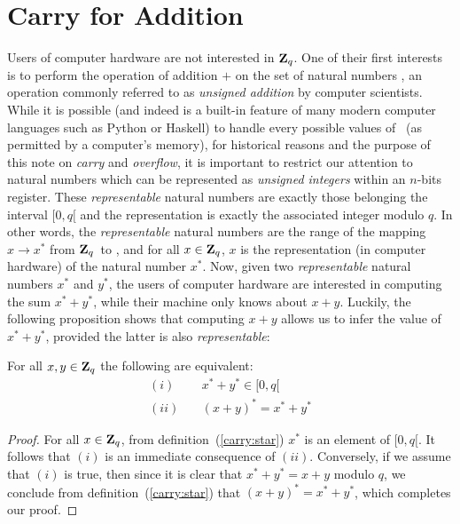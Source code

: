 \documentclass{article}
\newcommand{\zq}{\mbox{${\bf Z}_{q}$}}
\begin{document}
\section{Carry for Addition}
Users of computer hardware are not interested in \zq. One of their first interests
is to perform the operation of addition $+$ on the set of natural numbers \N, 
an operation commonly referred to as {\em unsigned addition} by computer 
scientists. While it is possible (and indeed is a built-in feature of many modern 
computer languages such as Python or Haskell) to handle every possible values 
of \N\ (as permitted by a computer's memory), for historical reasons and the 
purpose of this note on {\em carry} and {\em overflow}, it is important to 
restrict our attention to natural numbers which can be represented as 
{\em unsigned integers} within an $n$-bits register. These {\em representable}
natural numbers are exactly those belonging the interval $[0,q[$ and the
representation is exactly the associated integer modulo $q$. In other words,
the {\em representable} natural numbers are the range of the mapping 
$x\rightarrow x^{*}$ from \zq\ to \N, and for all $x\in\zq$, $x$ is the
representation (in computer hardware) of the natural number $x^{*}$. Now,
given two {\em representable} natural numbers $x^{*}$ and $y^{*}$, the users of 
computer hardware are interested in computing the sum $x^{*} + y^{*}$, while 
their machine only knows about $x+y$. Luckily, the following proposition shows that
computing $x+y$ allows us to infer the value of $x^{*}+y^{*}$, provided the 
latter is also {\em representable}:

\begin{prop}\label{carry:unsigned:add:morphism}
For all $x,y\in\zq$ the following are equivalent:
  \begin{eqnarray*}
    (i)&\ &x^{*} + y^{*}\in [0,q[\\
    (ii)&\ &(x + y)^{*} = x^{*} + y^{*} 
  \end{eqnarray*}
\end{prop}
\begin{proof}
  For all $x\in\zq$, from definition~(\ref{carry:star}) $x^{*}$ is an element 
  of $[0,q[$. It follows that $(i)$ is an immediate consequence of $(ii)$. 
  Conversely, if we assume that $(i)$ is true, then since it is clear that 
  $x^{*} + y^{*} = x + y$ modulo $q$, we conclude from 
  definition~(\ref{carry:star}) that $(x+y)^{*} = x^{*} + y^{*}$, 
  which completes our proof.
\end{proof}
\end{document}
